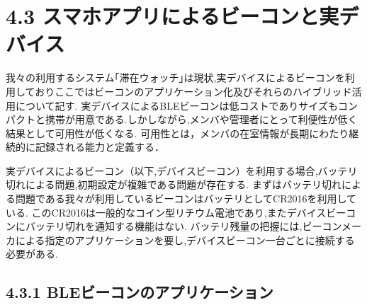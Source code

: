 \section*{4.3 スマホアプリによるビーコンと実デバイス}
 我々の利用するシステム｢滞在ウォッチ｣は現状,実デバイスによるビーコンを利用しておりここではビーコンのアプリケーション化及びそれらのハイブリッド活用について記す.
 実デバイスによるBLEビーコンは低コストでありサイズもコンパクトと携帯が用意である.しかしながら,メンバや管理者にとって利便性が低く結果として可用性が低くなる.
 可用性とは，メンバの在室情報が長期にわたり継続的に記録される能力と定義する．
 
 実デバイスによるビーコン（以下,デバイスビーコン）を利用する場合,バッテリ切れによる問題,初期設定が複雑である問題が存在する.
まずはバッテリ切れによる問題である我々が利用しているビーコンはバッテリとしてCR2016を利用している.
このCR2016は一般的なコイン型リチウム電池であり,またデバイスビーコンにバッテリ切れを通知する機能はない.
バッテリ残量の把握には,ビーコンメーカによる指定のアプリケーションを要し,デバイスビーコン一台ごとに接続する必要がある.




\subsection*{4.3.1 BLEビーコンのアプリケーション}